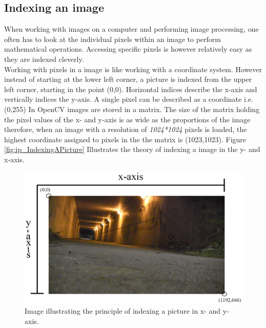 \subsection{Indexing an image}
When working with images on a computer and performing image processing, one often has to look at the individual pixels within an image to perform mathematical operations. Accessing specific pixels is however relatively easy as they are indexed cleverly.\\
Working with pixels in a image is like working with a coordinate system. However instead of starting at the lower left corner, a picture is indexed from the upper left corner, starting in the point (0,0). Horizontal indices describe the x-axis and vertically indices the y-axis. A single pixel can be described as a coordinate i.e. (0,255)  In OpenCV images are stored in a matrix. The size of the matrix holding the pixel values of the x- and y-axis is as wide as the proportions of the image therefore, when an image with a resolution of \textit{1024*1024} pixels is loaded, the highest coordinate assigned to pixels in the the matrix is (1023,1023). Figure \eqref{fig:ip_IndexingAPicture} Illustrates the theory of indexing a image in the y- and x-axis.\\
\begin{figure}[htbp]
\centering
\includegraphics[width=1.00\textwidth]{Pictures/Theory/IndexingAPicture.png}
\caption{Image illustrating the principle of indexing a picture in x- and y-axis.}
\label{fig:ip_IndexingAPicture}
\end{figure}

